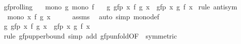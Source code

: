 \begin{isabellebody}
\isamarkupfalse%
%
\endisatagproof
{\isafoldproof}%
%
\isadelimproof
\isanewline
%
\endisadelimproof
\isanewline
{}\isamarkupfalse%
\ gfp{\isacharunderscore}{\kern0pt}rolling{\isacharcolon}{\kern0pt}\isanewline
\ \ \ {\isachardoublequoteopen}mono\ g{\isachardoublequoteclose}\ {\isachardoublequoteopen}mono\ f{\isachardoublequoteclose}\isanewline
\ \ \ {\isachardoublequoteopen}g\ {\isacharparenleft}{\kern0pt}gfp\ {\isacharparenleft}{\kern0pt}{\isasymlambda}x{\isachardot}{\kern0pt}\ f\ {\isacharparenleft}{\kern0pt}g\ x{\isacharparenright}{\kern0pt}{\isacharparenright}{\kern0pt}{\isacharparenright}{\kern0pt}\ {\isacharequal}{\kern0pt}\ gfp\ {\isacharparenleft}{\kern0pt}{\isasymlambda}x{\isachardot}{\kern0pt}\ g\ {\isacharparenleft}{\kern0pt}f\ x{\isacharparenright}{\kern0pt}{\isacharparenright}{\kern0pt}{\isachardoublequoteclose}\isanewline
%
\isadelimproof
%
\endisadelimproof
%
\isatagproof
{}\isamarkupfalse%
\ {\isacharparenleft}{\kern0pt}rule\ antisym{\isacharparenright}{\kern0pt}\isanewline
\ \ \isamarkupfalse%
\ {\isacharasterisk}{\kern0pt}{\isacharcolon}{\kern0pt}\ {\isachardoublequoteopen}mono\ {\isacharparenleft}{\kern0pt}{\isasymlambda}x{\isachardot}{\kern0pt}\ f\ {\isacharparenleft}{\kern0pt}g\ x{\isacharparenright}{\kern0pt}{\isacharparenright}{\kern0pt}{\isachardoublequoteclose}\isanewline
\ \ \ \ \isamarkupfalse%
\ assms\ \isamarkupfalse%
\ {\isacharparenleft}{\kern0pt}auto\ simp{\isacharcolon}{\kern0pt}\ mono{\isacharunderscore}{\kern0pt}def{\isacharparenright}{\kern0pt}\isanewline
\ \ \isamarkupfalse%
\ {\isachardoublequoteopen}g\ {\isacharparenleft}{\kern0pt}gfp\ {\isacharparenleft}{\kern0pt}{\isasymlambda}x{\isachardot}{\kern0pt}\ f\ {\isacharparenleft}{\kern0pt}g\ x{\isacharparenright}{\kern0pt}{\isacharparenright}{\kern0pt}{\isacharparenright}{\kern0pt}\ {\isasymle}\ gfp\ {\isacharparenleft}{\kern0pt}{\isasymlambda}x{\isachardot}{\kern0pt}\ g\ {\isacharparenleft}{\kern0pt}f\ x{\isacharparenright}{\kern0pt}{\isacharparenright}{\kern0pt}{\isachardoublequoteclose}\isanewline
\ \ \ \ \isamarkupfalse%
\ {\isacharparenleft}{\kern0pt}rule\ gfp{\isacharunderscore}{\kern0pt}upperbound{\isacharparenright}{\kern0pt}\ {\isacharparenleft}{\kern0pt}simp\ add{\isacharcolon}{\kern0pt}\ gfp{\isacharunderscore}{\kern0pt}unfold{\isacharbrackleft}{\kern0pt}OF\ {\isacharasterisk}{\kern0pt}{\isacharcomma}{\kern0pt}\ symmetric{\isacharbrackright}{\kern0pt}{\isacharparenright}{\kern0pt}\isanewline

\end{isabellebody}
